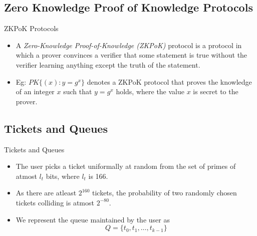 \documentclass[
	xcolor={svgnames},
	hyperref={pagebackref,bookmarks},
	aspectratio=43,
]{beamer}
\begin{document}
\subsection*{Zero Knowledge Proof of Knowledge Protocols}
\begin{frame}{ZKPoK Protocols}
	\begin{itemize}
		\item A \textit{Zero-Knowledge Proof-of-Knowledge (ZKPoK)} protocol is a protocol in which a prover convinces a verifier that some statement is true without the verifier learning anything except the truth of the statement.
		\item Eg: $PK \{(x) : y = g^x\}$ denotes a
		ZKPoK protocol that proves the knowledge of an integer $x$ such that $y = g^x$ holds, where the value $x$ is secret to the prover.
	\end{itemize}
\end{frame}

\subsection{Tickets and Queues}
\begin{frame}{Tickets and Queues}
	\begin{itemize}[<alert@+>]
		\item The user picks a ticket uniformally at random from the set of primes of atmost $l_t$ bits, where $l_t$ is 166. 
		\item As there are atleast $2^{160}$ tickets, the probability of two randomly chosen tickets colliding is atmost $2^{-80}$.
		\item We represent the queue maintained by the user as
		\vspace*{-3mm} $$Q = \{t_0, t_1, \dots, t_{k-1}\}$$
	\end{itemize}
\end{frame}
\end{document}
